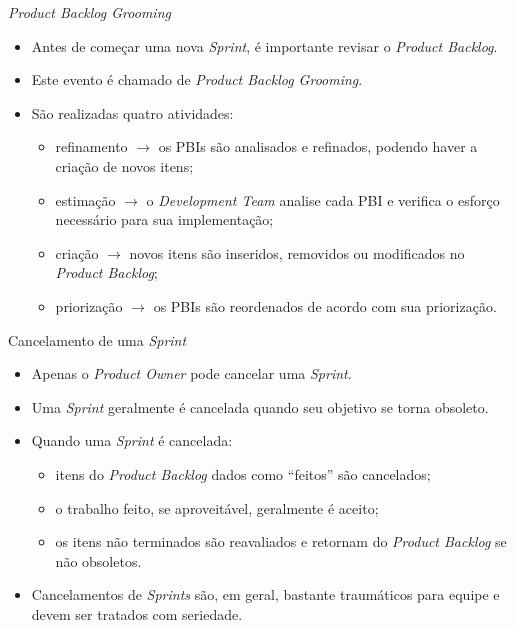 \documentclass[11pt]{beamer}
\begin{document}
    \begin{frame}{\textit{Product Backlog Grooming}}
      \begin{itemize}
         \item Antes de começar uma nova \textit{Sprint}, é importante revisar o \textit{Product Backlog}.
         \item Este evento é chamado de \textit{Product Backlog Grooming}.
         \item São realizadas quatro atividades:
           \begin{itemize}
              \item refinamento $\rightarrow$ os PBIs são analisados e refinados, podendo haver a criação de novos itens;
              \item estimação $\rightarrow$ o \textit{Development Team} analise cada PBI e verifica o esforço necessário para sua implementação;
              \item criação $\rightarrow$ novos itens são inseridos, removidos ou modificados no \textit{Product Backlog};
              \item priorização $\rightarrow$ os PBIs são reordenados de acordo com sua priorização.
           \end{itemize}
      \end{itemize}
    \end{frame}

    \begin{frame}{Cancelamento de uma \textit{Sprint}}
      \begin{itemize}
         \item Apenas o \textit{Product Owner} pode cancelar uma \textit{Sprint}.
         \item Uma \textit{Sprint} geralmente é cancelada quando seu objetivo se torna obsoleto.
         \item Quando uma \textit{Sprint} é cancelada:
           \begin{itemize}
              \item itens do \textit{Product Backlog} dados como ``feitos'' são cancelados;
              \item o trabalho feito, se aproveitável, geralmente é aceito;
              \item os itens não terminados são reavaliados e retornam do \textit{Product Backlog} se não obsoletos.
           \end{itemize}
         \item Cancelamentos de \textit{Sprints} são, em geral, bastante traumáticos para equipe e devem ser tratados com seriedade.
      \end{itemize}
    \end{frame}
    
\end{document}
